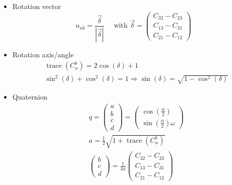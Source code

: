 \documentclass[class=article, crop=false]{standalone}
\begin{document}
\begin{itemize}
    \item Rotation vector
    \begin{equation}
        u_{nb} = \frac{\vec{\delta}}{|\vec{\delta}|} \quad \text{ with } \vec{\delta} =
        \begin{pmatrix}
            C_{32}-C_{23}\\
            C_{13}-C_{31}\\
            C_{21}-C_{12}
        \end{pmatrix}
    \end{equation}
    \item Rotation axis/angle
        \begin{subequations}
        \begin{align}
            &\operatorname{trace}(C_n^b) = 2 \cos{(\delta)} + 1\\
            &\sin^2{(\delta)} + \cos^2{(\delta)} = 1 \Rightarrow \sin{(\delta)} = \sqrt{1 - \cos^2{(\delta)}}
        \end{align}
        \end{subequations}
    \item Quaternion
        \begin{subequations}
        \begin{align}
            &q = \begin{pmatrix} a\\ b\\ c\\ d \end{pmatrix} =
            \begin{pmatrix}
                \cos{(\frac{\alpha}{2})}\\
                \sin{(\frac{\alpha}{2})} \omega
            \end{pmatrix} \\
            &a = \frac{1}{2} \sqrt{1 + \operatorname{trace}(C_n^b)}\\
            &\begin{pmatrix} b \\ c \\ d \end{pmatrix} = \frac{1}{4a} \begin{pmatrix}
            C_{32}-C_{23}\\
            C_{13}-C_{31}\\
            C_{21}-C_{12}
            \end{pmatrix}
        \end{align}
        \end{subequations}
\end{itemize}
\end{document}
